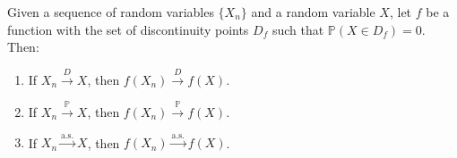 \documentclass{huhtakm-template-book-v2}
\newcommand{\prob}{\mathbb{P}}
\begin{document}
    \begin{thm}
        Given a sequence of random variables $\{X_{n}\}$ and a random variable $X$, let $f$ be a function with the set of discontinuity points $D_{f}$ such that $\prob(X \in D_{f}) = 0$. Then:
        \begin{enumerate}
            \item If $X_{n} \xrightarrow{D} X$, then $f(X_{n}) \xrightarrow{D} f(X)$.
            \item If $X_{n} \xrightarrow{\prob} X$, then $f(X_{n}) \xrightarrow{\prob} f(X)$.
            \item If $X_{n} \xrightarrow{\text{a.s.}} X$, then $f(X_{n}) \xrightarrow{\text{a.s.}} f(X)$.
        \end{enumerate}
    \end{thm}
\end{document}
